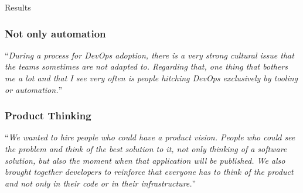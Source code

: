 \documentclass{beamer}
\newcommand{\memph}[1]{\alert{#1}}
\begin{document}
\begin{frame}
\huge{Results} 
\end{frame}


\begin{frame}
  \frametitle{Not only automation}

  \begin{flushright}
    ``\emph{During a process for DevOps adoption, there is a very
    strong cultural issue that the teams sometimes are not adapted to.
    Regarding that, \memph{one thing that bothers me} a lot and that I see very often
    is \memph{people hitching DevOps exclusively by tooling or automation}.}''
  \end{flushright}
\end{frame}

\begin{frame}
  \frametitle{Product Thinking}

  \begin{flushright}
    ``\emph{We wanted to \memph{hire people who could have a product vision}.
    People who could see the problem and think of the best solution to it, 
    \memph{not only thinking of a software solution, but also the moment when that
    application will be published}. We also brought together developers to
    reinforce that everyone has to think of the product and not only in their
    code or in their infrastructure.}''
  \end{flushright}
\end{frame}
\end{document}
